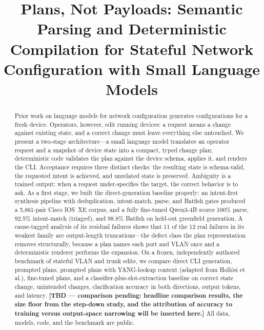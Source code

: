 \documentclass[conference]{IEEEtran}
\begin{document}
\title{Plans, Not Payloads: Semantic Parsing and Deterministic Compilation for Stateful Network Configuration with Small Language Models}

\author{
}

\maketitle

\begin{abstract}
Prior work on language models for network configuration generates configurations for a fresh device. Operators, however, edit running devices: a request means a change against existing state, and a correct change must leave everything else untouched. We present a two-stage architecture---a small language model translates an operator request and a snapshot of device state into a compact, typed change plan; deterministic code validates the plan against the device schema, applies it, and renders the CLI. Acceptance requires three distinct checks: the resulting state is schema-valid, the requested intent is achieved, and unrelated state is preserved. Ambiguity is a trained output: when a request under-specifies the target, the correct behavior is to ask. As a first stage, we built the direct-generation baseline properly: an intent-first synthesis pipeline with deduplication, intent-match, parse, and Batfish gates produced a 5,861-pair Cisco IOS~XE corpus, and a fully fine-tuned Qwen3-4B scores 100\% parse, 92.5\% intent-match (triaged), and 98.8\% Batfish on held-out greenfield generation. A cause-tagged analysis of its residual failures shows that 11 of the 12 real failures in its weakest family are output-length truncations---the defect class the plan representation removes structurally, because a plan names each port and VLAN once and a deterministic renderer performs the expansion. On a frozen, independently authored benchmark of stateful VLAN and trunk edits, we compare direct CLI generation, prompted plans, prompted plans with YANG-lookup context (adapted from Holl\'osi et al.), fine-tuned plans, and a classifier-plus-slot-extraction baseline on correct state change, unintended changes, clarification accuracy in both directions, output tokens, and latency. \textbf{[TBD --- comparison pending: headline comparison results, the size floor from the step-down study, and the attribution of accuracy to training versus output-space narrowing will be inserted here.]} All data, models, code, and the benchmark are public.
\end{abstract}
\end{document}

